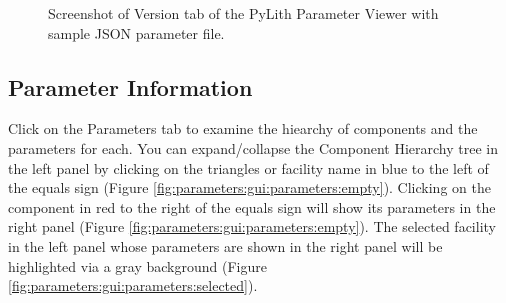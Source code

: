 \begin{figure}[htbp]
  \caption{Screenshot of \textsf{Version} tab of the PyLith Parameter Viewer
    with sample JSON parameter file.}
  \label{fig:parameters:gui:version} 
\end{figure}


\subsection{Parameter Information}

Click on the \textsf{Parameters} tab to examine the hiearchy of
components and the parameters for each. You can expand/collapse the
Component Hierarchy tree in the left panel by clicking on the
triangles or facility name in blue to the left of the equals sign
(Figure \ref{fig:parameters:gui:parameters:empty}).  Clicking on the
component in red to the right of the equals sign will show its
parameters in the right panel (Figure
\ref{fig:parameters:gui:parameters:empty}).  The selected facility in
the left panel whose parameters are shown in the right panel will be
highlighted via a gray background (Figure
\ref{fig:parameters:gui:parameters:selected}).

